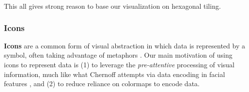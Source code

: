 %
%
This all gives strong reason to base our visualization on hexagonal tiling.

\subsubsection{Icons}
\textbf{Icons} are a common form of visual abstraction in which data is represented by a symbol, often taking advantage of metaphors  \cite{nocke2005icon, presnov_pacemod_2023}.
%
Our main motivation of using icons to represent data is (1) to leverage the \textit{pre-attentive} processing of visual information, much like what Chernoff attempts via data encoding in facial features \cite{chernoff1973use}, and (2) to reduce reliance on colormaps to encode data.
%


